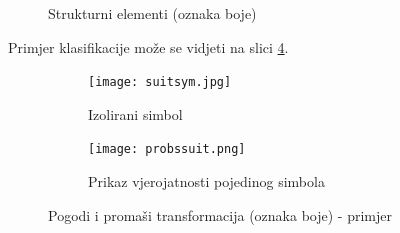 \documentclass[times, zavrsni, numeric, utf8]{fer}
\begin{document}
\begin{figure}[H]
\begin{subfigure}[b]{0.15\textwidth}
					\caption{}
				\end{subfigure}
				\caption{Strukturni elementi (oznaka boje)}
				\label{fig:suitse}
			\end{figure}
Primjer klasifikacije može se vidjeti na slici \ref{fig:homsuits}. 
\begin{figure}[H]
\begin{subfigure}{.5\textwidth}
  \centering
  \texttt{[image: suitsym.jpg]}
  \caption{Izolirani simbol}
  \label{fig:suitsymbol}
\end{subfigure}%
\begin{subfigure}{.5\textwidth}
  \centering
  \texttt{[image: probssuit.png]}
  \caption{Prikaz vjerojatnosti pojedinog simbola}
  \label{fig:termout1}
\end{subfigure}
\caption{Pogodi i promaši transformacija (oznaka boje) - primjer}
\label{fig:homsuits}
\end{figure}
\end{document}

